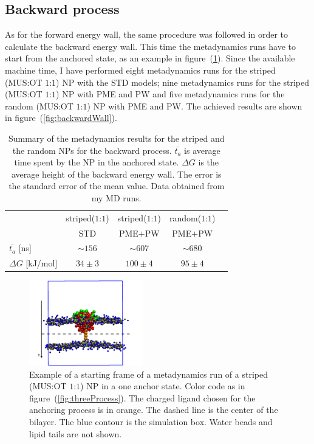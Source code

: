 \subsection{Backward process}
As for the forward energy wall, the same procedure was followed in order to calculate the backward energy wall. This time the metadynamics runs have to start from the anchored state, as an example in figure~(\ref{fig:startFrameAnchored}). Since the available machine time, I have performed eight metadynamics runs for the striped (\ac{MUS}:\ac{OT} $1$:$1$) \ac{NP} with the \ac{STD} \martini models; nine metadynamics runs for the striped (\ac{MUS}:\ac{OT} $1$:$1$) \ac{NP} with \ac{PME} and \ac{PW} and five metadynamics runs for the random (\ac{MUS}:\ac{OT} $1$:$1$) \ac{NP} with \ac{PME} and \ac{PW}. The achieved results are shown in figure~(\ref{fig:backwardWall}).
\begin{table}[h!t]
	\centering
	\begin{tabular}{lcccc}
		\toprule
		\,					& striped($1$:$1$)	& striped($1$:$1$)	& random($1$:$1$)	\\
		\,					& STD & \acs{PME}$+$\acs{PW} & \acs{PME}$+$\acs{PW} \\ \toprule
	$\overline{t_{a}}$ [ns]	& $\sim 156$	& $\sim 607$	& $\sim 680$	\\ \midrule
	$\Delta G$ [kJ/mol] 	& $34 \pm 3$ 	& $100 \pm 4$ 	& $95 \pm 4$	\\ \bottomrule
	\end{tabular}
	\caption{Summary of the metadynamics results for the striped and the random \acp{NP} for the backward process. $\overline{t_a}$ is average time spent by the \acs{NP} in the anchored state. $\Delta G$ is the average height of the backward energy wall. The error is the standard error of the mean value. Data obtained from my \acs{MD} runs.}%
	\label{tab:anchorTime}
\end{table}

\begin{figure}
	\centering
	\includegraphics[width=0.44\textwidth]{./img/patchedAnchored.pdf}
	\caption{Example of a starting frame of a metadynamics run of a striped (\ac{MUS}:\ac{OT} $1$:$1$) \ac{NP} in a one anchor state. Color code as in figure~(\ref{fig:threeProcess}). The charged ligand chosen for the anchoring process is in orange. The dashed line is the center of the bilayer. The blue contour is the simulation box. Water beads and lipid tails are not shown.}%
	\label{fig:startFrameAnchored}
\end{figure}

